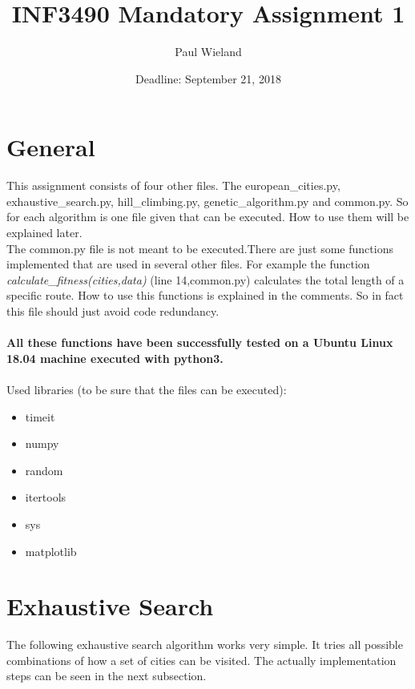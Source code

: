\documentclass[10pt,a4paper]{article}
\author{Paul Wieland}
\title{INF3490 Mandatory Assignment 1}
\date{Deadline: September 21, 2018}
\begin{document}
	\maketitle
	\tableofcontents
	\newpage
	\section{General}
	This assignment consists of four other files. The european\_cities.py, exhaustive\_search.py,  hill\_climbing.py, genetic\_algorithm.py and common.py. 
	So for each algorithm is one file given that can be executed. How to use them will be explained later.\\
	The common.py file is not meant to be executed.There are just some functions implemented that are used in several other files. For example the function \textit{calculate\_fitness(cities,data)} (line 14,common.py) calculates the total length of a specific route. How to use this functions is explained in the comments. So in fact this file should just avoid code redundancy.
	\\
	\\
	\textbf{All these functions have been successfully tested on a Ubuntu Linux 18.04 machine executed with python3.}
	\\
	\\
	Used libraries (to be sure that the files can be executed):
	\begin{itemize}
		\item timeit
		\item numpy
		\item random
		\item itertools
		\item sys
		\item matplotlib
	\end{itemize}
	\section{Exhaustive Search}
	The following exhaustive search algorithm works very simple. It tries all possible combinations of how a set of cities can be visited. The actually implementation steps can be seen in the next subsection.
\end{document}
